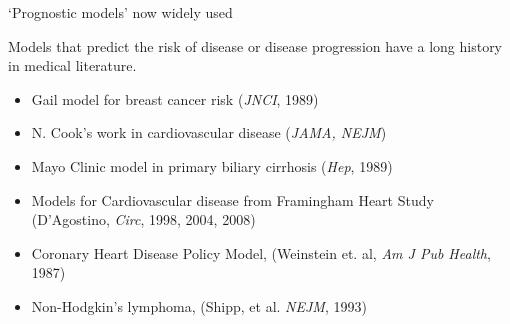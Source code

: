 \documentclass[11pt]{beamer}
\begin{document}
\begin{frame}{`Prognostic models' now widely used}

Models that predict the risk of disease or disease progression
have a long history in medical literature.

\begin{itemize}
  \item Gail model for breast cancer risk (\textsl{JNCI}, 1989)

  \item N. Cook's work in cardiovascular disease (\textsl{JAMA, NEJM})

  \item Mayo Clinic model in primary biliary cirrhosis (\textsl{Hep}, 1989)

  \item Models for Cardiovascular disease from Framingham Heart
  Study (D'Agostino, \textsl{Circ}, 1998, 2004, 2008)

  \item Coronary Heart Disease Policy Model, (Weinstein et. al,
  \textsl{Am J Pub Health}, 1987)

  \item Non-Hodgkin's lymphoma, (Shipp, et al. \textsl{NEJM}, 1993)


\end{itemize}

\end{frame}

\end{document}
